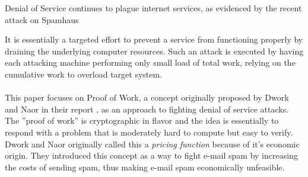 Denial of Service continues to plague internet services, as evidenced by the recent attack on Spamhaus \cite{BBC}

It is essentially a targeted effort to prevent a service from functioning properly by draining the underlying computer resources. Such an attack is executed by having each attacking machine performing only small load of total work, relying on the cumulative work to overload target system. 
\\
\\
This paper focuses on Proof of Work, a concept originally proposed by Dwork and Naor in their report , as an approach to fighting denial of service attacks. The ''proof of work'' is cryptographic in flavor and the idea is essentially to respond with a problem that is moderately hard to compute but easy to verify. Dwork and Naor originally called this a \emph{pricing function} because of it's economic origin. They introduced this concept as a way to fight e-mail spam by increasing the costs of sending spam, thus making e-mail spam economically unfeasible.

